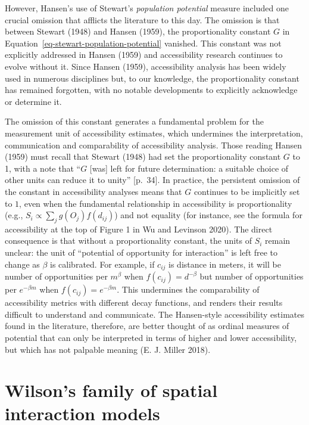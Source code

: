 \documentclass[
]{article}
\begin{document}
However, Hansen's use of Stewart's \emph{population potential} measure
included one crucial omission that afflicts the literature to this day.
The omission is that between Stewart (1948) and Hansen (1959), the
proportionality constant \(G\) in
Equation~\ref{eq-stewart-population-potential} vanished. This constant
was not explicitly addressed in Hansen (1959) and accessibility research
continues to evolve without it. Since Hansen (1959), accessibility
analysis has been widely used in numerous disciplines but, to our
knowledge, the proportionality constant has remained forgotten, with no
notable developments to explicitly acknowledge or determine it.

The omission of this constant generates a fundamental problem for the
measurement unit of accessibility estimates, which undermines the
interpretation, communication and comparability of accessibility
analysis. Those reading Hansen (1959) must recall that Stewart (1948)
had set the proportionality constant \(G\) to 1, with a note that
``\(G\) {[}was{]} left for future determination: a suitable choice of
other units can reduce it to unity'' {[}p.~34{]}. In practice, the
persistent omission of the constant in accessibility analyses means that
\(G\) continues to be implicitly set to \(1\), even when the fundamental
relationship in accessibility is proportionality (e.g.,
\(S_{i} \propto \sum_j g(O_j)f(d_{ij})\)) and not equality (for
instance, see the formula for accessibility at the top of Figure 1 in Wu
and Levinson 2020). The direct consequence is that without a
proportionality constant, the units of \(S_i\) remain unclear: the unit
of ``potential of opportunity for interaction'' is left free to change
as \(\beta\) is calibrated. For example, if \(c_{ij}\) is distance in
meters, it will be number of opportunities per \(m^{\beta}\) when
\(f(c_{ij}) = d^{-\beta}\) but number of opportunities per
\(e^{-\beta m}\) when \(f(c_{ij}) = e^{-\beta m}\). This undermines the
comparability of accessibility metrics with different decay functions,
and renders their results difficult to understand and communicate. The
Hansen-style accessibility estimates found in the literature, therefore,
are better thought of as ordinal measures of potential that can only be
interpreted in terms of higher and lower accessibility, but which has
not palpable meaning (E. J. Miller 2018).

\section{Wilson's family of spatial interaction
models}\label{wilsons-family-of-spatial-interaction-models}
\end{document}
